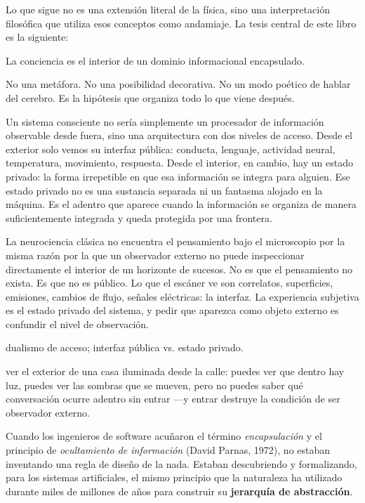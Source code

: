 Lo que sigue no es una extensión literal de la física, sino una interpretación filosófica que utiliza esos conceptos como andamiaje. La tesis central de este libro es la siguiente:

\begin{tesis}
La conciencia es el interior de un dominio informacional encapsulado.
\end{tesis}

No una metáfora. No una posibilidad decorativa. No un modo poético de hablar del cerebro. Es la hipótesis que organiza todo lo que viene después.

Un sistema consciente no sería simplemente un procesador de información observable desde fuera, sino una arquitectura con dos niveles de acceso. Desde el exterior solo vemos su interfaz pública: conducta, lenguaje, actividad neural, temperatura, movimiento, respuesta. Desde el interior, en cambio, hay un estado privado: la forma irrepetible en que esa información se integra para alguien. Ese estado privado no es una sustancia separada ni un fantasma alojado en la máquina. Es el adentro que aparece cuando la información se organiza de manera suficientemente integrada y queda protegida por una frontera.

La neurociencia clásica no encuentra el pensamiento bajo el microscopio por la misma razón por la que un observador externo no puede inspeccionar directamente el interior de un horizonte de sucesos. No es que el pensamiento no exista. Es que no es público. Lo que el escáner ve son correlatos, superficies, emisiones, cambios de flujo, señales eléctricas: la interfaz. La experiencia subjetiva es el estado privado del sistema, y pedir que aparezca como objeto externo es confundir el nivel de observación.

\begin{fisica}
 dualismo de acceso; interfaz pública vs. estado privado.

 ver el exterior de una casa iluminada desde la calle: puedes ver que dentro hay luz, puedes ver las sombras que se mueven, pero no puedes saber qué conversación ocurre adentro sin entrar —y entrar destruye la condición de ser observador externo.
\end{fisica}


\noindent Cuando los ingenieros de software acuñaron el término \emph{encapsulación} y el principio de \emph{ocultamiento de información} (David Parnas, 1972), no estaban inventando una regla de diseño de la nada. Estaban descubriendo y formalizando, para los sistemas artificiales, el mismo principio que la naturaleza ha utilizado durante miles de millones de años para construir su \textbf{jerarquía de abstracción}.

